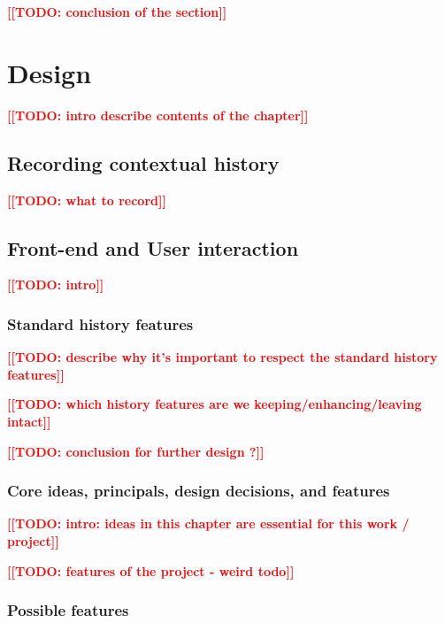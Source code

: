 \documentclass[thesis=M,english]{FITthesis}[2012/10/20]
\newcommand{\todotext}[1]{\textcolor{red}{\textbf{[[#1]]}}}
\newcommand{\blind}[1][1]{\textcolor{mygray}{\Blindtext[#1][1]}}
\begin{document}
\blind[2]

\todotext{TODO: conclusion of the section}



\chapter{Design}
\todotext{TODO: intro describe contents of the chapter}

\blind
{}
\section{Recording contextual history}

\todotext{TODO: what to record}

\blind[2]

\section{Front-end and User interaction}

\todotext{TODO: intro}

\blind

\subsection{Standard history features}

\todotext{TODO: describe why it's important to respect the standard history features}

\todotext{TODO: which history features are we keeping/enhancing/leaving intact}

\blind[3]

\todotext{TODO: conclusion for further design ?}



\subsection{Core ideas, principals, design decisions, and features}

\todotext{TODO: intro: ideas in this chapter are essential for this work / project}

\todotext{TODO: features of the project - weird todo}

\blind[3]

\subsection{Possible features}
\end{document}
